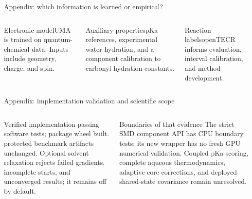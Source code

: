 \appendix
\begin{frame}{Appendix: which information is learned or empirical?}
\begin{columns}[T]
\begin{block}{Electronic model}\small UMA is trained on quantum-chemical data. Inputs include geometry, charge, and spin.\end{block}
\begin{block}{Auxiliary properties}\small pKa references, experimental water hydration, and a component calibration to carbonyl hydration constants.\end{block}
\begin{block}{Reaction labels}\small openTECR informs evaluation, interval calibration, and method development.\end{block}
\end{columns}
\gap{}
\end{frame}

\begin{frame}{Appendix: implementation validation and scientific scope}
\begin{columns}[T]
\begin{block}{Verified implementation}
\small \ImplementationTests{} passing software tests; package wheel built.\gap
\ProtectedArtifacts{} protected benchmark artifacts unchanged.\gap
Optional solvent relaxation rejects failed gradients, incomplete starts, and unconverged results; it remains off by default.
\end{block}
\begin{block}{Boundaries of that evidence}
\small The strict SMD component API has CPU boundary tests; its new wrapper has no fresh GPU numerical validation.\gap
Coupled pKa scoring, complete aqueous thermodynamics, adaptive core corrections, and deployed shared-state covariance remain unresolved.
\end{block}
\end{columns}
\end{frame}

